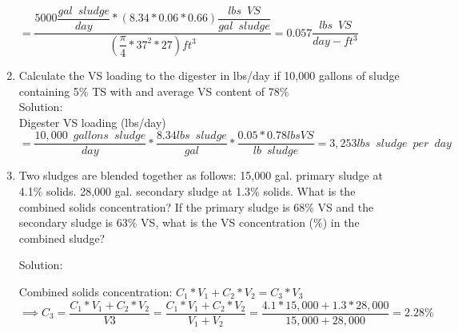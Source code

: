 \begin{enumerate}
                        {
                        $=\dfrac
                            {
                                5000
                                \dfrac
                                    {gal \enspace sludge}
                                    {day}
                                *(8.34*0.06*0.66) 
                                \dfrac
                                    {lbs \enspace VS}
                                    {gal \enspace  sludge}
                            }
                            {
                                (\dfrac
                                    {\pi}
                                    {4}*37^2*27)ft^3
                            }
                        =\boxed
                            {
                                0.057 \dfrac
                                    {lbs \enspace VS}
                                    {day-ft^3}
                            }
                        $}

                    \item Calculate the VS loading to the digester in lbs/day if 10,000 gallons of sludge containing 5\% TS with and average VS content of 78\%\\
                    Solution:\\
                    Digester VS loading (lbs/day)\\$=\dfrac{10,000 \enspace gallons \enspace sludge}{day}*\dfrac{8.34lbs \enspace sludge}{gal}*\dfrac{0.05*0.78lbs VS}{lb \enspace sludge}=\boxed{3,253lbs \enspace sludge \enspace per \enspace day}$

                    \item Two sludges are blended together as follows: 15,000 gal. primary sludge at 4.1\% solids. 28,000 gal. secondary sludge at 1.3\% solids. What is the combined solids concentration?  If the primary sludge is 68\% VS and the secondary sludge is 63\% VS, what is the VS concentration (\%) in the combined sludge?

                    Solution:

                    Combined solids concentration:
                    $
                    C_1*V_1 + C_2*V_2 = C_3*V_3$\\
                    \vspace{0.3cm}
                    $\implies C_3 = \dfrac{C_1*V_1 + C_2*V_2}{V3}=\dfrac{C_1*V_1 + C_2*V_2}{V_1 + V_2}=\dfrac{4.1*15,000 + 1.3*28,000}{15,000 + 28,000}=\boxed{2.28\%}
                    $\\
                                        \vspace{0.3cm}


\end{enumerate}
